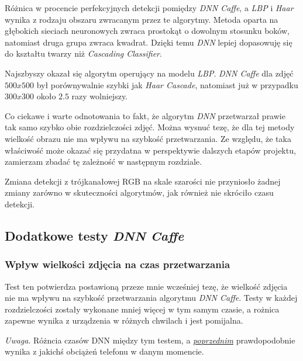 \documentclass[10pt, a4paper]{article}
\begin{document}
\vspace{5mm}
Różnica w procencie perfekcyjnych detekcji pomiędzy \textit{DNN Caffe}, a \textit{LBP} i \textit{Haar} wynika z rodzaju obszaru zwracanym przez te algorytmy. Metoda oparta na głębokich sieciach neuronowych zwraca prostokąt o dowolnym stosunku boków, natomiast druga grupa zwraca kwadrat. Dzięki temu \textit{DNN} lepiej dopasowuję się do kształtu twarzy niż \textit{Cascading Classifier}.

\vspace{5mm}

Najszbyszy okazał się algorytm operujący na modelu \textit{LBP}. \textit{DNN Caffe} dla zdjęć $500x500$  był porównywalnie szybki jak \textit{Haar Cascade}, natomiast już w przypadku $300x300$ około $2.5$ razy wolniejszy.
\par
Co ciekawe i warte odnotowania to fakt, że algorytm \textit{DNN} przetwarzał prawie tak samo szybko obie rozdzielczości zdjęć. Można wysnuć tezę, że dla tej metody wielkość obrazu nie ma wpływu na szybkość przetwarzania. Ze względu, że taka właściwość może okazać się przydatna w perspektywie dalszych etapów projektu, zamierzam zbadać tę zależność w następnym rozdziale.

\vspace{5mm}

Zmiana detekcji z trójkanałowej RGB na skale szarości nie przyniosło żadnej zmiany zarówno w skuteczności algorytmów, jak również nie skróciło czasu detekcji.

\subsection{Dodatkowe testy \textit{DNN Caffe}}

\subsubsection{Wpływ wielkości zdjęcia na czas przetwarzania}



Test ten potwierdza postawioną przeze mnie wcześniej tezę, że wielkość zdjęcia nie ma wpływu na szybkość przetwarzania algorytmu \textit{DNN Caffe}. Testy w każdej rozdzielczości zostały wykonane mniej więcej w tym samym czasie, a rożnica zapewne wynika z urządzenia w różnych chwilach i jest pomijalna.

\textit{Uwaga}. Różncia czasów DNN między tym testem, a \hyperref[{section:face_main_test}]{\textit{poprzednim}} prawdopodobnie wynika z jakichś obciążeń telefonu w danym momencie.
\end{document}
